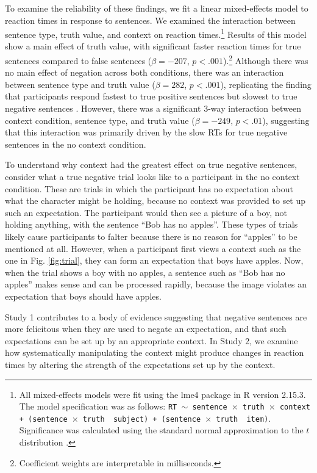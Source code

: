\documentclass[10pt,letterpaper]{article}
\begin{document}
To examine the reliability of these findings, we fit a linear mixed-effects model to reaction times in response to sentences.  We examined the interaction between sentence type, truth value, and context on reaction times.\footnote{All mixed-effects models were fit using the lme4 package in R version 2.15.3.  The model specification was as follows: \texttt{RT $\sim$ sentence~$\times$~truth~$\times$~context + (sentence~$\times$~truth~\textbar~subject) +  (sentence~$\times$~truth~\textbar~item)}.  Significance was calculated using the standard normal approximation to the $t$ distribution \cite{barr2013}.}  Results of this model show a main effect of truth value, with significant faster reaction times for true sentences compared to false sentences ($\beta= -207$, $p< .001$).\footnote{Coefficient weights are interpretable in milliseconds.}  Although there was no main effect of negation across both conditions, there was an interaction between sentence type and truth value ($\beta= 282$, $p< .001$), replicating the finding that participants respond fastest to true positive sentences but slowest to true negative sentences  \cite{hclark1972}.  However, there was a significant 3-way interaction between context condition, sentence type, and truth value ($\beta= -249$, $p< .01$), suggesting that this interaction was primarily driven by the slow RTs for true negative sentences in the no context condition.  

To understand why context had the greatest effect on true negative sentences, consider what a true negative trial looks like to a participant in the no context condition.  These are trials in which the participant has no expectation about what the character might be holding, because no context was provided to set up such an expectation.  The participant would then see a picture of a boy, not holding anything, with the sentence ``Bob has no apples''.  These types of trials likely cause participants to falter because there is no reason for ``apples'' to be mentioned at all.  However, when a participant first views a context such as the one in Fig. \ref{fig:trial}, they can form an expectation that boys have apples.  Now, when the trial shows a boy with no apples, a sentence such as ``Bob has no apples'' makes sense and can be processed rapidly, because the image violates an expectation that boys should have apples.  

Study 1 contributes to a body of evidence suggesting that negative sentences are more felicitous when they are used to negate an expectation, and that such expectations can be set up by an appropriate context.  In Study 2, we examine how systematically manipulating the context might produce changes in reaction times by altering the strength of the expectations set up by the context.  
\end{document}
